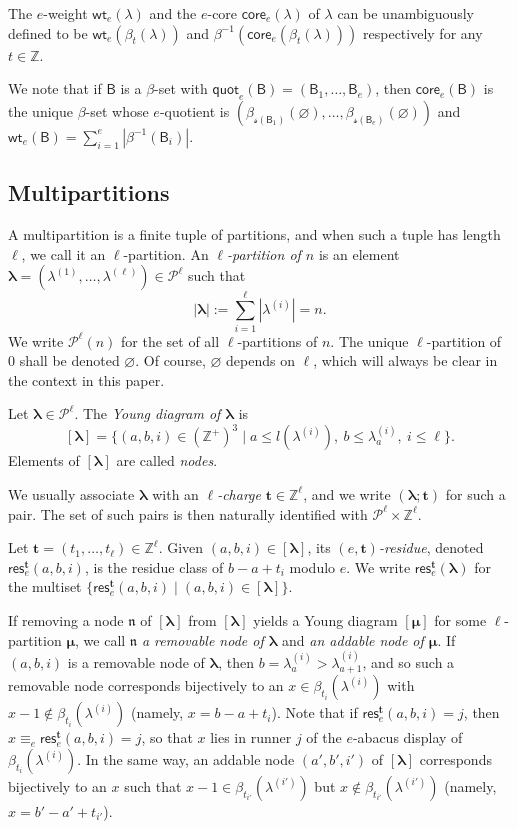 \documentclass[11pt,a4paper,reqno]{amsart}
\numberwithin{equation}{section}
\theoremstyle{plain}
\theoremstyle{definition}
\theoremstyle{remark}
\numberwithin{equation}{section}
\newcommand{\bl}{\boldsymbol{\lambda}}
\newcommand{\bm}{\boldsymbol{\mu}}
\newcommand{\fs}{\mathcal{s}}
\newcommand{\bt}{\mathbf{t}}
\newcommand{\wt}{\mathsf{wt}}
\newcommand{\core}{\mathsf{core}}
\newcommand{\quot}{\mathsf{quot}}
\newcommand{\B}{\mathsf{B}}
\newcommand{\PP}{\mathcal{P}}
\newcommand{\res}{\mathsf{res}}
\newcommand{\cont}{\mathsf{cont}}
\newcommand{\len}{l}
\newcommand{\EP}{\pmb{\varnothing}}
\def\Z{{\mathbb Z}}
\begin{document}
The $e$-weight $\wt_e(\lambda)$ and the $e$-core $\core_e(\lambda)$ of  $\lambda$ can be unambiguously defined to be $\wt_e(\beta_t(\lambda))$ and $\beta^{-1}(\core_e(\beta_t(\lambda)))$ respectively for any $t \in \mathbb{Z}$.

We note that if $\B$ is a $\beta$-set with $\quot_e(\B) = (\B_{1},\dotsc, \B_{e})$, then $\core_e(\B)$ is the unique $\beta$-set whose $e$-quotient is $(\beta_{\fs(\B_1)}(\varnothing), \dotsc, \beta_{\fs(\B_{e})} (\varnothing))$ and $\wt_e(\B) = \sum_{i=1}^{e} |\beta^{-1}(\B_{i})|$.



\subsection{Multipartitions}

A multipartition is a finite tuple of partitions, and when such a tuple has length $\ell$, we call it an $\ell$-partition.
An {\em $\ell$-partition of $n$} is an element $\bl = (\lambda^{(1)}, \dotsc, \lambda^{(\ell)}) \in \PP^{\ell}$ such that
$$
|\bl| := \sum_{i=1}^{\ell} |\lambda^{(i)}| = n.$$
We write $\PP^{\ell}(n)$ for the set of all $\ell$-partitions of $n$.
The unique $\ell$-partition of $0$ shall be denoted $\EP$.  Of course, $\EP$ depends on $\ell$, which will always be clear in the context in this paper.

Let $\bl \in \PP^{\ell}$.  The  {\em Young diagram of $\bl$} is
$$[\bl] = \{ (a,b,i) \in (\Z^+)^3 \mid a \leq \len(\lambda^{(i)}),\ b \leq \lambda^{(i)}_a,\ i \leq \ell \}.$$
Elements of $[\bl]$ are called {\em nodes}.

We usually associate $\bl$ with an {\em $\ell$-charge} $\bt \in \Z^{\ell}$, and we write \index{$(\bl; \bt)$} $(\bl; \bt)$ for such a pair.  The set of such pairs is then naturally identified with $\PP^{\ell} \times \Z^{\ell}$.


Let $\bt = (t_1,\dotsc, t_{\ell}) \in \Z^{\ell}$.
Given $(a,b,i) \in [\bl]$, its {\em $(e,\bt)$-residue}, denoted $\res_e^{\bt}(a,b,i)$,
is the residue class of $b-a + t_i$ %
modulo $e$. 
We write $\res^{\bt}_e(\bl)$ for the multiset $\{\res_e^{\bt}(a,b,i) \mid (a,b,i) \in [\bl]\}$.

If removing a node $\mathfrak{n}$ of $[\bl]$ from $[\bl]$ yields a Young diagram $[\bm]$ for some $\ell$-partition $\bm$, we call $\mathfrak{n}$ {\em a removable node of $\bl$} and {\em an addable node of $\bm$}.
If $(a,b,i)$ is a removable node of $\bl$, then $b = \lambda^{(i)}_a > \lambda^{(i)}_{a+1}$, and so
such a removable node corresponds bijectively to an $x \in \beta_{t_i}(\lambda^{(i)})$  with $x-1 \notin \beta_{t_i}(\lambda^{(i)})$ (namely, $x = b-a+t_i$).
Note that if $\res_e^{\bt} (a,b,i) = j$, then $x %
\equiv_e \res^{\bt}_e(a,b,i) = j$, so that $x$ lies in runner $j$ of the $e$-abacus display of $\beta_{t_i}(\lambda^{(i)})$.
In the same way, an addable node $(a',b',i')$ of $[\bl]$ corresponds bijectively to an $x$ such that $x-1 \in \beta_{t_{i'}}(\lambda^{(i')})$ but $x \notin \beta_{t_{i'}}(\lambda^{(i')})$ (namely, $x = b'-a' +t_{i'}$).
\end{document}
